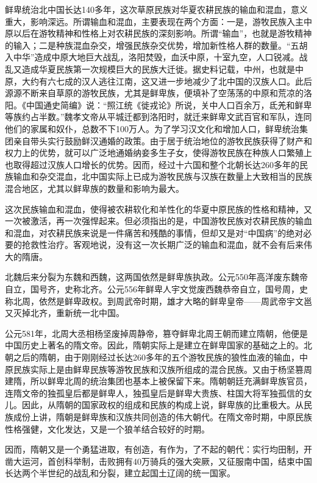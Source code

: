 \par 鲜卑统治北中国长达140多年，这次草原民族对华夏农耕民族的输血和混血，意义重大，影响深远。所谓输血和混血，主要表现在两个方面：一是，游牧民族入主中原以后在游牧精神和性格上对农耕民族的深刻影响。所谓“输血”，也就是游牧精神的输入；二是种族混血杂交，增强民族杂交优势，增加新性格人群的数量。“五胡入中华”造成中原大地巨大战乱，洛阳焚毁，血沃中原，十室九空，人口锐减。战乱又造成华夏民族第一次规模巨大的民族大迁徙。据史料记载，中州，也就是中原，大约有六七成的汉人逃往江南，这又进一步地减少了北中国的汉族人口。此后源源不断来自草原的游牧民族，尤其是鲜卑族，便填补了空荡荡的中原和荒凉的洛阳。《中国通史简编》说：“照江统《徙戎论》所说，关中人口百余万，氐羌和鲜卑等族约占半数。”魏孝文帝从平城迁都到洛阳时，就迁来鲜卑文武百官和军队，连同他们的家属和奴仆，总数不下100万人。为了学习汉文化和增加人口，鲜卑统治集团亲自带头实行鼓励鲜汉通婚的政策。由于居于统治地位的游牧民族获得了财产和权力上的优势，就可以广泛地通婚纳妾多生子女，使得游牧民族在种族人口繁殖上也取得超过汉族人口增长的优势。因而，经过十六国和整个北朝长达260多年的民族输血和杂交混血，北中国实际上已成为游牧民族与汉族在数量上大致相当的民族混合地区，尤其以鲜卑族的数量和影响为最大。
\par 这次民族输血和混血，使得被农耕软化和羊性化的华夏中原民族的性格和精神，又一次被激活，再一次强悍起来。但必须指出的是，中国游牧民族对农耕民族的输血和混血，对农耕民族来说是一件痛苦和残酷的事情，但却又是对“中国病”的绝对必要的抢救性治疗。客观地说，没有这一次长期广泛的输血和混血，就不会有后来伟大的隋唐。
\par 北魏后来分裂为东魏和西魏，这两国依然是鲜卑族执政。公元550年高洋废东魏帝自立，国号齐，史称北齐。公元556年鲜卑人宇文觉废西魏恭帝自立，国号周，史称北周，依然是鲜卑政权。到周武帝时期，雄才大略的鲜卑皇帝——周武帝宇文邕又灭掉北齐，重新统一北中国。
\par 公元581年，北周大丞相杨坚废掉周静帝，篡夺鲜卑北周王朝而建立隋朝，他便是中国历史上著名的隋文帝。因此，隋朝实际上是建立在鲜卑国家的基础之上的。北朝之后的隋朝，由于刚刚经过长达260多年的五个游牧民族的狼性血液的输血，中原民族实际上是由鲜卑民族等游牧民族和汉族所组成的混合民族。又由于杨坚篡周建隋，所以鲜卑北周的统治集团也基本上被保留下来。隋朝朝廷充满鲜卑族官员，连隋文帝的独孤皇后都是鲜卑人，独孤皇后是鲜卑大贵族、柱国大将军独孤信的女儿。因此，从隋朝的国家政权的组成和民族的构成上说，鲜卑族的比重极大。从民族成份上讲，隋朝是鲜卑族和汉族共同创造的伟大朝代。在隋文帝时期，中原民族性格强健，文化发达，又是一个狼羊结合较好的时期。
\par 因而，隋朝又是一个勇猛进取，有创造，有作为，了不起的朝代：实行均田制，开凿大运河，首创科举制，击败拥有40万骑兵的强大突厥，又征服南中国，结束中国长达两个半世纪的战乱和分裂，建立起国土辽阔的统一国家。
